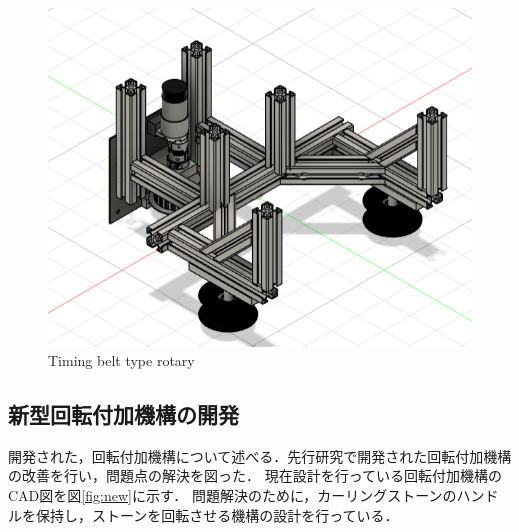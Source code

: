 \documentclass{classes/sice-si}
\begin{document}
\begin{figure}[h]
\begin{minipage}{0.4\linewidth}
        \centering
        \includegraphics[width=\linewidth]{figures/3.png}
        \caption{Timing belt type rotary}
        \label{fig:three}
    \end{minipage}
    \vspace{0pt} %
\end{figure}
\subsection{新型回転付加機構の開発}
開発された，回転付加機構について述べる．先行研究で開発された回転付加機構の改善を行い，問題点の解決を図った．
現在設計を行っている回転付加機構のCAD図を図\ref{fig:new}に示す．
問題解決のために，カーリングストーンのハンドルを保持し，ストーンを回転させる機構の設計を行っている．
\end{document}
